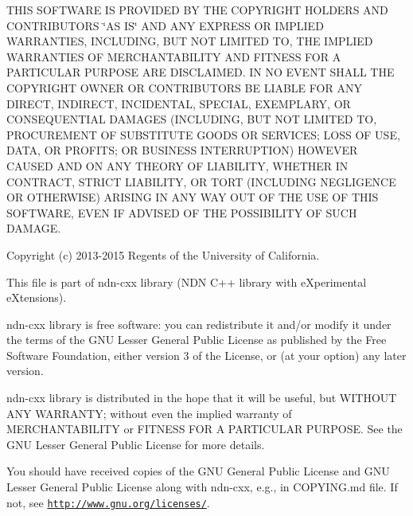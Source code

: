 T\+H\+IS S\+O\+F\+T\+W\+A\+RE IS P\+R\+O\+V\+I\+D\+ED BY T\+HE C\+O\+P\+Y\+R\+I\+G\+HT H\+O\+L\+D\+E\+RS A\+ND C\+O\+N\+T\+R\+I\+B\+U\+T\+O\+RS \char`\"{}\+A\+S I\+S\char`\"{} A\+ND A\+NY E\+X\+P\+R\+E\+SS OR I\+M\+P\+L\+I\+ED W\+A\+R\+R\+A\+N\+T\+I\+ES, I\+N\+C\+L\+U\+D\+I\+NG, B\+UT N\+OT L\+I\+M\+I\+T\+ED TO, T\+HE I\+M\+P\+L\+I\+ED W\+A\+R\+R\+A\+N\+T\+I\+ES OF M\+E\+R\+C\+H\+A\+N\+T\+A\+B\+I\+L\+I\+TY A\+ND F\+I\+T\+N\+E\+SS F\+OR A P\+A\+R\+T\+I\+C\+U\+L\+AR P\+U\+R\+P\+O\+SE A\+RE D\+I\+S\+C\+L\+A\+I\+M\+ED. IN NO E\+V\+E\+NT S\+H\+A\+LL T\+HE C\+O\+P\+Y\+R\+I\+G\+HT O\+W\+N\+ER OR C\+O\+N\+T\+R\+I\+B\+U\+T\+O\+RS BE L\+I\+A\+B\+LE F\+OR A\+NY D\+I\+R\+E\+CT, I\+N\+D\+I\+R\+E\+CT, I\+N\+C\+I\+D\+E\+N\+T\+AL, S\+P\+E\+C\+I\+AL, E\+X\+E\+M\+P\+L\+A\+RY, OR C\+O\+N\+S\+E\+Q\+U\+E\+N\+T\+I\+AL D\+A\+M\+A\+G\+ES (I\+N\+C\+L\+U\+D\+I\+NG, B\+UT N\+OT L\+I\+M\+I\+T\+ED TO, P\+R\+O\+C\+U\+R\+E\+M\+E\+NT OF S\+U\+B\+S\+T\+I\+T\+U\+TE G\+O\+O\+DS OR S\+E\+R\+V\+I\+C\+ES; L\+O\+SS OF U\+SE, D\+A\+TA, OR P\+R\+O\+F\+I\+TS; OR B\+U\+S\+I\+N\+E\+SS I\+N\+T\+E\+R\+R\+U\+P\+T\+I\+ON) H\+O\+W\+E\+V\+ER C\+A\+U\+S\+ED A\+ND ON A\+NY T\+H\+E\+O\+RY OF L\+I\+A\+B\+I\+L\+I\+TY, W\+H\+E\+T\+H\+ER IN C\+O\+N\+T\+R\+A\+CT, S\+T\+R\+I\+CT L\+I\+A\+B\+I\+L\+I\+TY, OR T\+O\+RT (I\+N\+C\+L\+U\+D\+I\+NG N\+E\+G\+L\+I\+G\+E\+N\+CE OR O\+T\+H\+E\+R\+W\+I\+SE) A\+R\+I\+S\+I\+NG IN A\+NY W\+AY O\+UT OF T\+HE U\+SE OF T\+H\+IS S\+O\+F\+T\+W\+A\+RE, E\+V\+EN IF A\+D\+V\+I\+S\+ED OF T\+HE P\+O\+S\+S\+I\+B\+I\+L\+I\+TY OF S\+U\+CH D\+A\+M\+A\+GE.

Copyright (c) 2013-\/2015 Regents of the University of California.

This file is part of ndn-\/cxx library (N\+DN C++ library with e\+Xperimental e\+Xtensions).

ndn-\/cxx library is free software\+: you can redistribute it and/or modify it under the terms of the G\+NU Lesser General Public License as published by the Free Software Foundation, either version 3 of the License, or (at your option) any later version.

ndn-\/cxx library is distributed in the hope that it will be useful, but W\+I\+T\+H\+O\+UT A\+NY W\+A\+R\+R\+A\+N\+TY; without even the implied warranty of M\+E\+R\+C\+H\+A\+N\+T\+A\+B\+I\+L\+I\+TY or F\+I\+T\+N\+E\+SS F\+OR A P\+A\+R\+T\+I\+C\+U\+L\+AR P\+U\+R\+P\+O\+SE. See the G\+NU Lesser General Public License for more details.

You should have received copies of the G\+NU General Public License and G\+NU Lesser General Public License along with ndn-\/cxx, e.\+g., in C\+O\+P\+Y\+I\+N\+G.\+md file. If not, see \href{http://www.gnu.org/licenses/}{\tt http\+://www.\+gnu.\+org/licenses/}.

